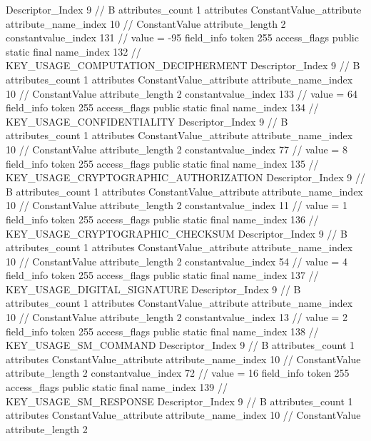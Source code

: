 {{{{{				Descriptor_Index	9		// B
				attributes_count	1
				attributes {
				ConstantValue_attribute {
					attribute_name_index	10		// ConstantValue
					attribute_length	2
					constantvalue_index	131		// value = -95
				}
				}
			}
			field_info {
				token	255
				access_flags	public static final
				name_index	132		// KEY_USAGE_COMPUTATION_DECIPHERMENT
				Descriptor_Index	9		// B
				attributes_count	1
				attributes {
				ConstantValue_attribute {
					attribute_name_index	10		// ConstantValue
					attribute_length	2
					constantvalue_index	133		// value = 64
				}
				}
			}
			field_info {
				token	255
				access_flags	public static final
				name_index	134		// KEY_USAGE_CONFIDENTIALITY
				Descriptor_Index	9		// B
				attributes_count	1
				attributes {
				ConstantValue_attribute {
					attribute_name_index	10		// ConstantValue
					attribute_length	2
					constantvalue_index	77		// value = 8
				}
				}
			}
			field_info {
				token	255
				access_flags	public static final
				name_index	135		// KEY_USAGE_CRYPTOGRAPHIC_AUTHORIZATION
				Descriptor_Index	9		// B
				attributes_count	1
				attributes {
				ConstantValue_attribute {
					attribute_name_index	10		// ConstantValue
					attribute_length	2
					constantvalue_index	11		// value = 1
				}
				}
			}
			field_info {
				token	255
				access_flags	public static final
				name_index	136		// KEY_USAGE_CRYPTOGRAPHIC_CHECKSUM
				Descriptor_Index	9		// B
				attributes_count	1
				attributes {
				ConstantValue_attribute {
					attribute_name_index	10		// ConstantValue
					attribute_length	2
					constantvalue_index	54		// value = 4
				}
				}
			}
			field_info {
				token	255
				access_flags	public static final
				name_index	137		// KEY_USAGE_DIGITAL_SIGNATURE
				Descriptor_Index	9		// B
				attributes_count	1
				attributes {
				ConstantValue_attribute {
					attribute_name_index	10		// ConstantValue
					attribute_length	2
					constantvalue_index	13		// value = 2
				}
				}
			}
			field_info {
				token	255
				access_flags	public static final
				name_index	138		// KEY_USAGE_SM_COMMAND
				Descriptor_Index	9		// B
				attributes_count	1
				attributes {
				ConstantValue_attribute {
					attribute_name_index	10		// ConstantValue
					attribute_length	2
					constantvalue_index	72		// value = 16
				}
				}
			}
			field_info {
				token	255
				access_flags	public static final
				name_index	139		// KEY_USAGE_SM_RESPONSE
				Descriptor_Index	9		// B
				attributes_count	1
				attributes {
				ConstantValue_attribute {
					attribute_name_index	10		// ConstantValue
					attribute_length	2
}}}}}}}

